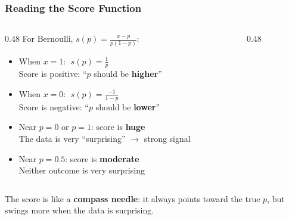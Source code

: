 \documentclass[aspectratio=169]{beamer}
\begin{document}
\begin{frame}
\frametitle{Reading the Score Function}

\begin{columns}[T]
\begin{column}{0.48\textwidth}
\small
For Bernoulli, $s(p) = \frac{x - p}{p(1-p)}$:

\vspace{0.1cm}
\begin{itemize}\setlength{\itemsep}{4pt}
  \item When $x = 1$: $\;s(p) = \frac{1}{p}$\\
    {\footnotesize Score is positive: ``$p$ should be \textbf{higher}''}
  \item When $x = 0$: $\;s(p) = \frac{-1}{1-p}$\\
    {\footnotesize Score is negative: ``$p$ should be \textbf{lower}''}
  \item Near $p = 0$ or $p = 1$: score is \textbf{huge}\\
    {\footnotesize The data is very ``surprising'' $\to$ strong signal}
  \item Near $p = 0.5$: score is \textbf{moderate}\\
    {\footnotesize Neither outcome is very surprising}
\end{itemize}
\end{column}
\begin{column}{0.48\textwidth}
\begin{center}
\end{center}
\end{column}
\end{columns}

\vspace{0.1cm}
\centering\small The score is like a \textbf{compass needle}: it always points toward the true $p$, but swings more when the data is surprising.
\end{frame}
\end{document}
